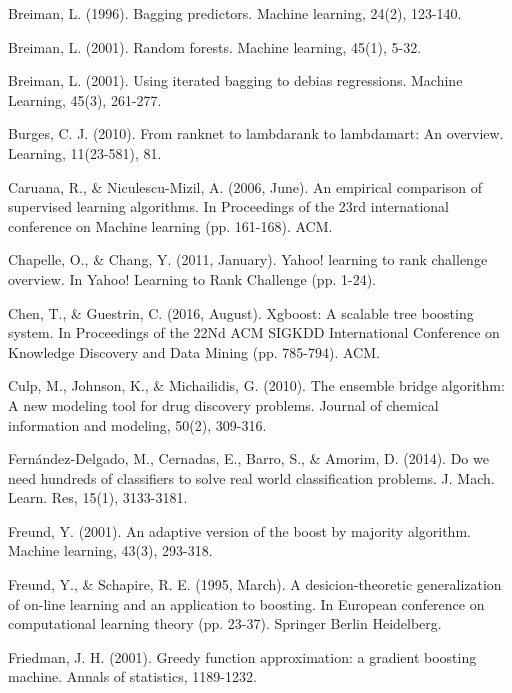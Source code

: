 \begin{thebibliography}{99}
\medskip

\small

Breiman, L. (1996). Bagging predictors. Machine learning, 24(2), 123-140.

Breiman, L. (2001). Random forests. Machine learning, 45(1), 5-32.

Breiman, L. (2001). Using iterated bagging to debias regressions. Machine Learning, 45(3), 261-277.

Burges, C. J. (2010). From ranknet to lambdarank to lambdamart: An overview. Learning, 11(23-581), 81.

Caruana, R., \& Niculescu-Mizil, A. (2006, June). An empirical comparison of supervised learning algorithms. In Proceedings of the 23rd international conference on Machine learning (pp. 161-168). ACM.

Chapelle, O., \& Chang, Y. (2011, January). Yahoo! learning to rank challenge overview. In Yahoo! Learning to Rank Challenge (pp. 1-24).

Chen, T., \& Guestrin, C. (2016, August). Xgboost: A scalable tree boosting system. In Proceedings of the 22Nd ACM SIGKDD International Conference on Knowledge Discovery and Data Mining (pp. 785-794). ACM.

Culp, M., Johnson, K., \& Michailidis, G. (2010). The ensemble bridge algorithm: A new modeling tool for drug discovery problems. Journal of chemical information and modeling, 50(2), 309-316.

Fernández-Delgado, M., Cernadas, E., Barro, S., \& Amorim, D. (2014). Do we need hundreds of classifiers to solve real world classification problems. J. Mach. Learn. Res, 15(1), 3133-3181.

Freund, Y. (2001). An adaptive version of the boost by majority algorithm. Machine learning, 43(3), 293-318.

Freund, Y., \& Schapire, R. E. (1995, March). A desicion-theoretic generalization of on-line learning and an application to boosting. In European conference on computational learning theory (pp. 23-37). Springer Berlin Heidelberg.

Friedman, J. H. (2001). Greedy function approximation: a gradient boosting machine. Annals of statistics, 1189-1232.


\end{thebibliography}
